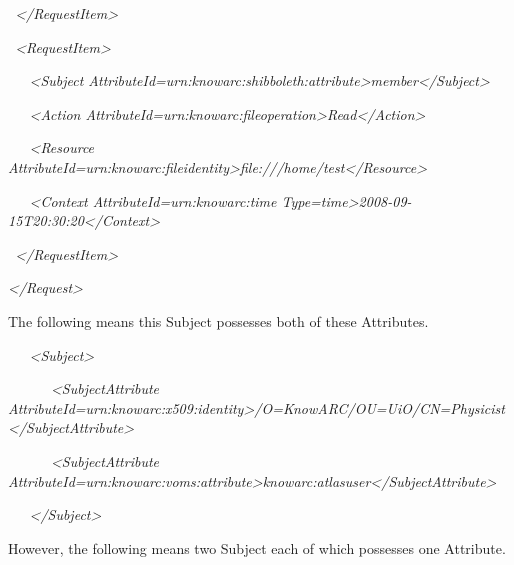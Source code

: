 \documentclass{article}
\begin{document}
{\itshape\color{black}
\ {\textless}/RequestItem{\textgreater}}

{\itshape\color{black}
\ {\textless}RequestItem{\textgreater}}

{\itshape\color{black}
\ \ \ {\textless}Subject
AttributeId={\textquotedbl}urn:knowarc:shibboleth:attribute{\textquotedbl}{\textgreater}member{\textless}/Subject{\textgreater}}

{\itshape\color{black}
\ \ \ {\textless}Action
AttributeId={\textquotedbl}urn:knowarc:fileoperation{\textquotedbl}{\textgreater}Read{\textless}/Action{\textgreater}}

{\itshape\color{black}
\ \ \ {\textless}Resource
AttributeId={\textquotedbl}urn:knowarc:fileidentity{\textgreater}file:///home/test{\textless}/Resource{\textgreater}}

{\itshape\color{black}
\ \ \ {\textless}Context
AttributeId={\textquotedbl}urn:knowarc:time{\textquotedbl}
Type={\textquotedbl}time{\textquotedbl}{\textgreater}2008-09-15T20:30:20{\textless}/Context{\textgreater}}

{\itshape\color{black}
\ {\textless}/RequestItem{\textgreater}}

{\itshape\color{black}
{\textless}/Request{\textgreater}}

{\color{black}
The following means this Subject possesses both of these Attributes.}

{\itshape\color{black}
\ \ \ {\textless}Subject{\textgreater}}

{\itshape\color{black}
\ \ \ \ \ \ {\textless}SubjectAttribute
AttributeId={\textquotedbl}urn:knowarc:x509:identity{\textquotedbl}{\textgreater}/O=KnowARC/OU=UiO/CN=Physicist{\textless}/SubjectAttribute{\textgreater}}

{\itshape\color{black}
\ \ \ \ \ \ {\textless}SubjectAttribute
AttributeId={\textquotedbl}urn:knowarc:voms:attribute{\textgreater}knowarc:atlasuser{\textless}/SubjectAttribute{\textgreater}}

{\itshape\color{black}
\ \ \ {\textless}/Subject{\textgreater}}

{\color{black}
However, the following means two Subject each of which possesses one
Attribute.}
\end{document}
